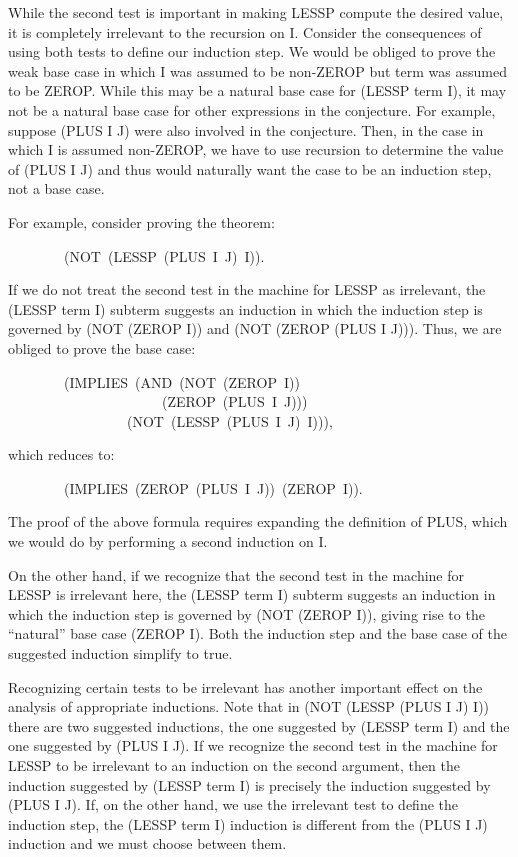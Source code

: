 \documentclass[10pt]{book}
\newenvironment{pubasis}{\begin{flushleft}}{\end{flushleft}}
\begin{document}
While the second test is important in making LESSP compute the
desired value, it is completely irrelevant to the recursion on I.
Consider the consequences of using both tests to define our induction
step.  We would be obliged to prove the weak base case in which I was
assumed to be non-ZEROP but term was assumed to be ZEROP.  While this
may be a natural base case for (LESSP term I), it may not be a
natural base case for other expressions in the conjecture.  For example,
suppose (PLUS I J) were also involved in the conjecture.  Then, in the case
in which I is assumed non-ZEROP, we have to use recursion to determine the
value of (PLUS I J) and thus would naturally want the case
to be an induction step, not a base case.

For example, consider proving the theorem:
\begin{pubasis}
~~~~~~~~(NOT~(LESSP~(PLUS~I~J)~I)).\\
\end{pubasis}
If we do not treat the second test in the machine for LESSP as
irrelevant, the (LESSP term I) subterm suggests an induction in which
the induction step is governed by (NOT (ZEROP I)) and (NOT (ZEROP (PLUS I J))).
Thus, we are obliged to prove the base case:
\begin{pubasis}
~~~~~~~~(IMPLIES~(AND~(NOT~(ZEROP~I))\\
~~~~~~~~~~~~~~~~~~~~~~(ZEROP~(PLUS~I~J)))\\
~~~~~~~~~~~~~~~~~(NOT~(LESSP~(PLUS~I~J)~I))),\\
\end{pubasis}
which reduces to:
\begin{pubasis}
~~~~~~~~(IMPLIES~(ZEROP~(PLUS~I~J))~(ZEROP~I)).\\
\end{pubasis}
The proof of the above formula requires expanding the definition of
PLUS, which we would do by performing a second induction on I.

On the other hand, if we recognize that the second test in the machine
for LESSP is irrelevant here, the (LESSP term I) subterm suggests
an induction in which the induction step is governed by (NOT (ZEROP I)),
giving rise to the ``natural'' base case (ZEROP I).  Both the induction
step and the base case of the suggested induction simplify to true.

Recognizing certain tests to be irrelevant has another important
effect on the analysis of appropriate inductions.
Note that in (NOT (LESSP (PLUS I J) I)) there are two suggested
inductions, the one suggested by (LESSP term I) and the one
suggested by (PLUS I J).  If we recognize the second test in the
machine for LESSP to be irrelevant to an induction on the
second argument, then the induction suggested by (LESSP term I)
is precisely the induction suggested by (PLUS I J).  If, on the
other hand, we use the irrelevant test to define the induction
step, the (LESSP term I) induction is different from the (PLUS I J)
induction and we must choose between them.
\end{document}
